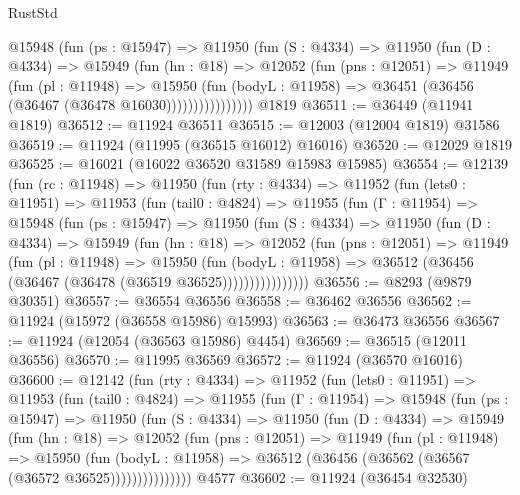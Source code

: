 \begin{lexlean}{RustStd}
\begin{coremodule}
              @15948
                (fun (ps : @15947) =>
                @11950
                  (fun (S : @4334) =>
                  @11950
                    (fun (D : @4334) =>
                    @15949
                      (fun (hn : @18) =>
                      @12052
                        (fun (pns : @12051) =>
                        @11949
                          (fun (pl : @11948) =>
                          @15950
                            (fun (bodyL : @11958) =>
                            @36451 (@36456 (@36467 (@36478 @16030))))))))))))))))
    @1819
@36511 := @36449 (@11941 @1819)
@36512 := @11924 @36511
@36515 := @12003 (@12004 @1819) @31586
@36519 := @11924 (@11995 (@36515 @16012) @16016)
@36520 := @12029 @1819
@36525 := @16021 (@16022 @36520 @31589 @15983 @15985)
@36554 := @12139
    (fun (rc : @11948) =>
    @11950
      (fun (rty : @4334) =>
      @11952
        (fun (lets0 : @11951) =>
        @11953
          (fun (tail0 : @4824) =>
          @11955
            (fun (Γ : @11954) =>
            @15948
              (fun (ps : @15947) =>
              @11950
                (fun (S : @4334) =>
                @11950
                  (fun (D : @4334) =>
                  @15949
                    (fun (hn : @18) =>
                    @12052
                      (fun (pns : @12051) =>
                      @11949
                        (fun (pl : @11948) =>
                        @15950
                          (fun (bodyL : @11958) =>
                          @36512 (@36456 (@36467 (@36478 (@36519 @36525))))))))))))))))
@36556 := @8293 (@9879 @30351)
@36557 := @36554 @36556
@36558 := @36462 @36556
@36562 := @11924 (@15972 (@36558 @15986) @15993)
@36563 := @36473 @36556
@36567 := @11924 (@12054 (@36563 @15986) @4454)
@36569 := @36515 (@12011 @36556)
@36570 := @11995 @36569
@36572 := @11924 (@36570 @16016)
@36600 := @12142
    (fun (rty : @4334) =>
    @11952
      (fun (lets0 : @11951) =>
      @11953
        (fun (tail0 : @4824) =>
        @11955
          (fun (Γ : @11954) =>
          @15948
            (fun (ps : @15947) =>
            @11950
              (fun (S : @4334) =>
              @11950
                (fun (D : @4334) =>
                @15949
                  (fun (hn : @18) =>
                  @12052
                    (fun (pns : @12051) =>
                    @11949
                      (fun (pl : @11948) =>
                      @15950
                        (fun (bodyL : @11958) =>
                        @36512 (@36456 (@36562 (@36567 (@36572 @36525)))))))))))))))
    @4577
@36602 := @11924 (@36454 @32530)

\end{coremodule}
\end{lexlean}

